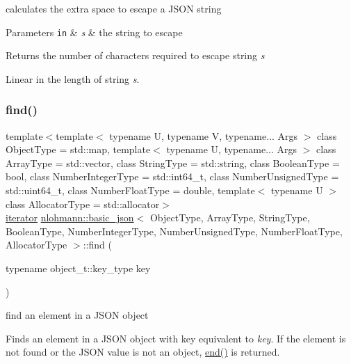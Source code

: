 calculates the extra space to escape a J\+S\+ON string 


\begin{DoxyParams}[1]{Parameters}
\mbox{\tt in}  & {\em s} & the string to escape \\
\hline
\end{DoxyParams}
\begin{DoxyReturn}{Returns}
the number of characters required to escape string {\itshape s} 
\end{DoxyReturn}
Linear in the length of string {\itshape s}. \hypertarget{classnlohmann_1_1basic__json_affe7e160e7bb06eed83c8b437af4692f}{}\label{classnlohmann_1_1basic__json_affe7e160e7bb06eed83c8b437af4692f} 
\subsubsection{\texorpdfstring{find()}{find()}\hspace{0.1cm}{\footnotesize\ttfamily [1/2]}}
{\footnotesize\ttfamily template$<$template$<$ typename U, typename V, typename... Args $>$ class Object\+Type = std\+::map, template$<$ typename U, typename... Args $>$ class Array\+Type = std\+::vector, class String\+Type  = std\+::string, class Boolean\+Type  = bool, class Number\+Integer\+Type  = std\+::int64\+\_\+t, class Number\+Unsigned\+Type  = std\+::uint64\+\_\+t, class Number\+Float\+Type  = double, template$<$ typename U $>$ class Allocator\+Type = std\+::allocator$>$ \\
\hyperlink{classnlohmann_1_1basic__json_1_1iterator}{iterator} \hyperlink{classnlohmann_1_1basic__json}{nlohmann\+::basic\+\_\+json}$<$ Object\+Type, Array\+Type, String\+Type, Boolean\+Type, Number\+Integer\+Type, Number\+Unsigned\+Type, Number\+Float\+Type, Allocator\+Type $>$\+::find (\begin{DoxyParamCaption}\item[{typename object\+\_\+t\+::key\+\_\+type}]{key }\end{DoxyParamCaption})\hspace{0.3cm}{\ttfamily [inline]}}



find an element in a J\+S\+ON object 

Finds an element in a J\+S\+ON object with key equivalent to {\itshape key}. If the element is not found or the J\+S\+ON value is not an object, \hyperlink{classnlohmann_1_1basic__json_a12ccf14d39ddae52f6c7e126105a230b}{end()} is returned.


